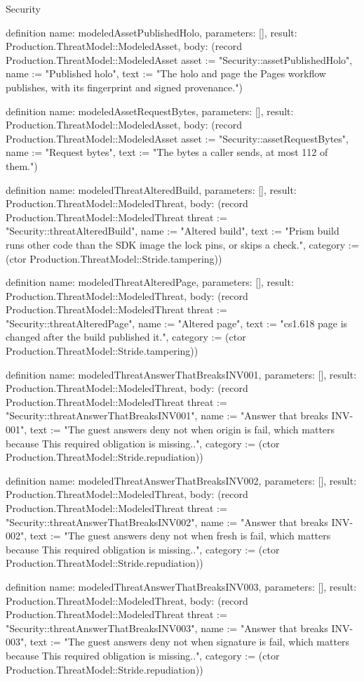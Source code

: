 \begin{lexlean}{Security}
\begin{semanticmodule}
definition{
  name: modeledAssetPublishedHolo,
  parameters: [],
  result: Production.ThreatModel::ModeledAsset,
  body: (record Production.ThreatModel::ModeledAsset {asset := "Security::assetPublishedHolo", name := "Published holo", text := "The holo and page the Pages workflow publishes, with its fingerprint and signed provenance."})
}

definition{
  name: modeledAssetRequestBytes,
  parameters: [],
  result: Production.ThreatModel::ModeledAsset,
  body: (record Production.ThreatModel::ModeledAsset {asset := "Security::assetRequestBytes", name := "Request bytes", text := "The bytes a caller sends, at most 112 of them."})
}

definition{
  name: modeledThreatAlteredBuild,
  parameters: [],
  result: Production.ThreatModel::ModeledThreat,
  body: (record Production.ThreatModel::ModeledThreat {threat := "Security::threatAlteredBuild", name := "Altered build", text := "Prism build runs other code than the SDK image the lock pins, or skips a check.", category := (ctor Production.ThreatModel::Stride.tampering)})
}

definition{
  name: modeledThreatAlteredPage,
  parameters: [],
  result: Production.ThreatModel::ModeledThreat,
  body: (record Production.ThreatModel::ModeledThreat {threat := "Security::threatAlteredPage", name := "Altered page", text := "cs1.618 page is changed after the build published it.", category := (ctor Production.ThreatModel::Stride.tampering)})
}

definition{
  name: modeledThreatAnswerThatBreaksINV001,
  parameters: [],
  result: Production.ThreatModel::ModeledThreat,
  body: (record Production.ThreatModel::ModeledThreat {threat := "Security::threatAnswerThatBreaksINV001", name := "Answer that breaks INV-001", text := "The guest answers deny not when origin is fail, which matters because This required obligation is missing..", category := (ctor Production.ThreatModel::Stride.repudiation)})
}

definition{
  name: modeledThreatAnswerThatBreaksINV002,
  parameters: [],
  result: Production.ThreatModel::ModeledThreat,
  body: (record Production.ThreatModel::ModeledThreat {threat := "Security::threatAnswerThatBreaksINV002", name := "Answer that breaks INV-002", text := "The guest answers deny not when fresh is fail, which matters because This required obligation is missing..", category := (ctor Production.ThreatModel::Stride.repudiation)})
}

definition{
  name: modeledThreatAnswerThatBreaksINV003,
  parameters: [],
  result: Production.ThreatModel::ModeledThreat,
  body: (record Production.ThreatModel::ModeledThreat {threat := "Security::threatAnswerThatBreaksINV003", name := "Answer that breaks INV-003", text := "The guest answers deny not when signature is fail, which matters because This required obligation is missing..", category := (ctor Production.ThreatModel::Stride.repudiation)})
}


\end{semanticmodule}
\end{lexlean}
